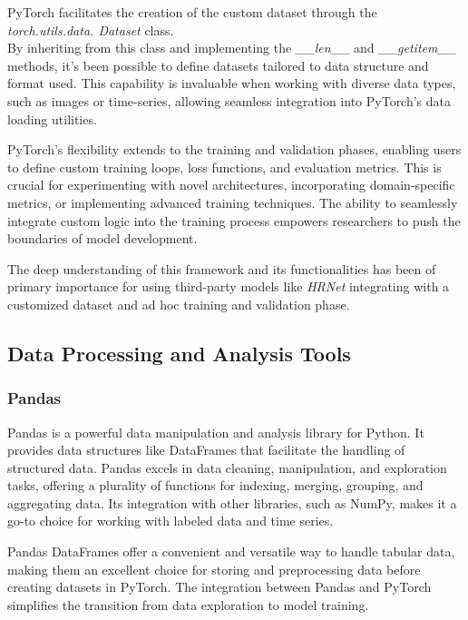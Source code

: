 PyTorch facilitates the creation of the custom dataset through the \textit{torch.utils.data. Dataset} class.\\ 
By inheriting from this class and implementing the \textit{\_\_len\_\_} and \textit{\_\_getitem\_\_} methods, it's been possible to define datasets tailored to data structure and format used. This capability is invaluable when working with diverse data types, such as images or time-series, allowing seamless integration into PyTorch's data loading utilities.

PyTorch's flexibility extends to the training and validation phases, enabling users to define custom training loops, loss functions, and evaluation metrics. This is crucial for experimenting with novel architectures, incorporating domain-specific metrics, or implementing advanced training techniques. The ability to seamlessly integrate custom logic into the training process empowers researchers to push the boundaries of model development.

The deep understanding of this framework and its functionalities has been of primary importance for using third-party models like \textit{HRNet}\cite{sun2019deep} integrating with a customized dataset and ad hoc training and validation phase.

\subsection{Data Processing and Analysis Tools}

\subsubsection{Pandas}
Pandas is a powerful data manipulation and analysis library for Python. It provides data structures like DataFrames that facilitate the handling of structured data. Pandas excels in data cleaning, manipulation, and exploration tasks, offering a plurality of functions for indexing, merging, grouping, and aggregating data. Its integration with other libraries, such as NumPy, makes it a go-to choice for working with labeled data and time series.

Pandas DataFrames offer a convenient and versatile way to handle tabular data, making them an excellent choice for storing and preprocessing data before creating datasets in PyTorch. The integration between Pandas and PyTorch simplifies the transition from data exploration to model training.

